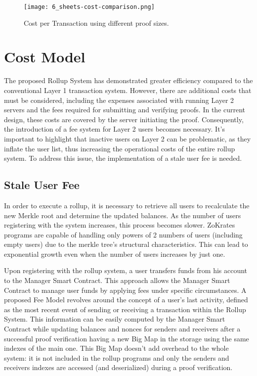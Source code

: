 \begin{figure}[ht]
	\centering
	\texttt{[image: 6\_sheets-cost-comparison.png]}
	\caption[Cost Comparison]{Cost per Transaction using different proof sizes.}  
	\label{fig:6_sheets-cost-comparison.png}
  \end{figure} 

  \section{Cost Model}

The proposed Rollup System has demonstrated greater efficiency compared to the conventional Layer 1 transaction system. However, there are additional costs that must be considered, including the expenses associated with running Layer 2 servers and the fees required for submitting and verifying proofs. In the current design, these costs are covered by the server initiating the proof. Consequently, the introduction of a fee system for Layer 2 users becomes necessary. It's important to highlight that inactive users on Layer 2 can be problematic, as they inflate the user list, thus increasing the operational costs of the entire rollup system. To address this issue, the implementation of a stale user fee is needed.

\subsection{Stale User Fee}

In order to execute a rollup, it is necessary to retrieve all users to recalculate the new Merkle root and determine the updated balances. As the number of users registering with the system increases, this process becomes slower. ZoKrates programs are capable of handling only powers of 2 numbers of users (including empty users) due to the merkle tree's structural characteristics. This can lead to exponential growth even when the number of users increases by just one.

Upon registering with the rollup system, a user transfers funds from his account to the Manager Smart Contract. This approach allows the Manager Smart Contract to manage user funds by applying fees under specific circumstances. A proposed Fee Model revolves around the concept of a user's last activity, defined as the most recent event of sending or receiving a transaction within the Rollup System. This information can be easily computed by the Manager Smart Contract while updating balances and nonces for senders and receivers after a successful proof verification having a new Big Map in the storage using the same indexes of the main one. This Big Map doesn't add overhead to the whole system: it is not included in the rollup programs and only the senders and receivers indexes are accessed (and deserialized) during a proof verification.

